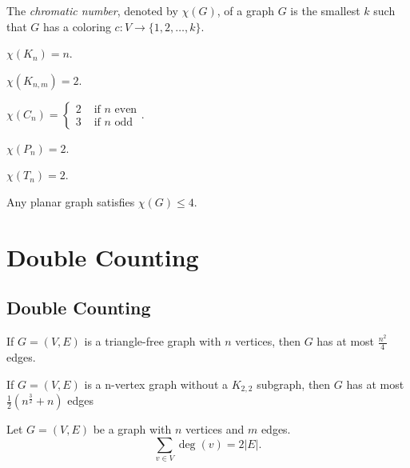 \documentclass{classnotes}
\begin{document}
\begin{definition}
    The \emph{chromatic number}, denoted by $\chi(G)$, of a graph $G$ is the smallest $k$ such that $G$ has a coloring $c: V \to \{1,2,\dots,k\}$.
\end{definition}

\begin{example}
    $\chi(K_n) = n$.
\end{example}
\begin{example}
    $\chi(K_{n,m}) = 2$.
\end{example}
\begin{example}
    $\chi(C_n) = \begin{cases} 2 &\text{ if } n \text{ even}\\ 3 &\text{ if } n \text{ odd}\end{cases}. $
\end{example}
\begin{example}
    $\chi(P_n) = 2$.
\end{example}
\begin{example}
    $\chi(T_n) = 2$.
\end{example}

\begin{theorem}
    Any planar graph satisfies $\chi(G) \le 4$.
\end{theorem}

\section{Double Counting}
\subsection{Double Counting}
\begin{theorem}
    If $G=(V,E)$ is a triangle-free graph with $n$ vertices, then $G$ has at most $\frac{n^2}{4}$ edges.
\end{theorem}
\begin{theorem}
    If $G=(V,E)$ is a n-vertex graph without a $K_{2,2}$ subgraph, then $G$ has at most $\frac{1}{2}(n^{\frac{3}{2}} +n)$ edges
\end{theorem}
\begin{proposition}
    Let $G=(V,E)$ be a graph with $n$ vertices and $m$ edges. 
    $$\sum_{v \in V} \deg(v) = 2 |E|.$$
\end{proposition}
\end{document}
